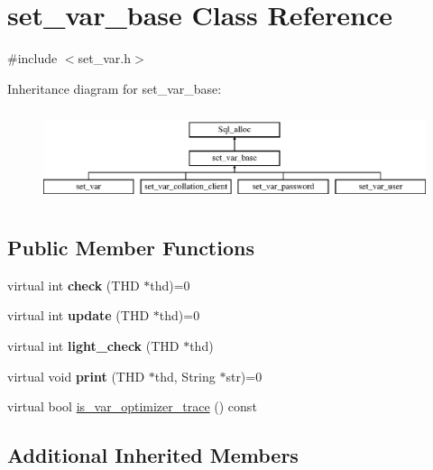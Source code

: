 \hypertarget{classset__var__base}{}\section{set\+\_\+var\+\_\+base Class Reference}
\label{classset__var__base}


{\ttfamily \#include $<$set\+\_\+var.\+h$>$}

Inheritance diagram for set\+\_\+var\+\_\+base\+:\begin{figure}[H]
\begin{center}
\leavevmode
\includegraphics[height=2.745098cm]{classset__var__base}
\end{center}
\end{figure}
\subsection*{Public Member Functions}
\begin{DoxyCompactItemize}
\item 
\mbox{\label{classset__var__base_a77d5021a5a9f523e420bf389fcc1201e}} 
virtual int {\bfseries check} (T\+HD $\ast$thd)=0
\item 
\mbox{\label{classset__var__base_aacd2b7bb1f42a5c6bca4fd3b219dfa86}} 
virtual int {\bfseries update} (T\+HD $\ast$thd)=0
\item 
\mbox{\label{classset__var__base_a843e03c67dcaf0b3098a168ae8ddbc77}} 
virtual int {\bfseries light\+\_\+check} (T\+HD $\ast$thd)
\item 
\mbox{\label{classset__var__base_ae797424fad72a565848098c2a6d694e4}} 
virtual void {\bfseries print} (T\+HD $\ast$thd, String $\ast$str)=0
\item 
virtual bool \mbox{\hyperlink{classset__var__base_aade139353a2e5110a47933bb349f3063}{is\+\_\+var\+\_\+optimizer\+\_\+trace}} () const
\end{DoxyCompactItemize}
\subsection*{Additional Inherited Members}


